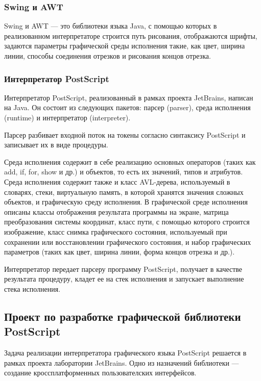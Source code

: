 \documentclass[14pt]{extarticle}
\begin{document}
		\subsubsection*{Swing и AWT}
		Swing и AWT --- это библиотеки языка Java, с помощью которых в реализованном интерпретаторе строится путь рисования, отображаются шрифты, задаются параметры графической среды исполнения такие, как цвет, ширина линии, способы соединения отрезков и рисования концов отрезка. 
		\subsubsection*{ Интерпретатор PostScript }
		Интерпретатор PostScript, реализованный в рамках проекта JetBrains, написан на Java. Он состоит из следующих пакетов: парсер (parser), среда исполнения (runtime) и интерпретатор (interpreter). 
		
		Парсер разбивает входной поток на токены согласно синтаксису PostScript и записывает их в виде процедуры.
		
		Среда исполнения содержит в себе реализацию основных операторов (таких как add, if, for, show и др.) и объектов, то есть их значений, типов и атрибутов. Среда исполнения содержит также и класс AVL-дерева, используемый в словарях, стеки, виртуальную память, в которой хранятся значения сложных объектов, и графическую среду исполнения. В графической среде исполнения описаны классы отображения результата программы на экране, матрица преобразования системы координат, класс пути, с помощью которого строится изображение, класс снимка графического состояния, используемый при сохранении или восстановлении графического состояния, и набор графических параметров (таких как цвет, ширина линии, форма концов отрезка и др.).
		
		Интерпретатор передает парсеру программу PostScript, получает в качестве результата процедуру, кладет ее на стек исполнения и запускает выполнение стека исполнения.
		
	\subsection{ Проект по разработке графической библиотеки PostScript }
Задача реализации интерпретатора графического языка PostScript решается в рамках проекта лаборатории JetBrains. Одно из назначений библиотеки --- создание кроссплатформенных пользователских интерфейсов.
		
\end{document}
